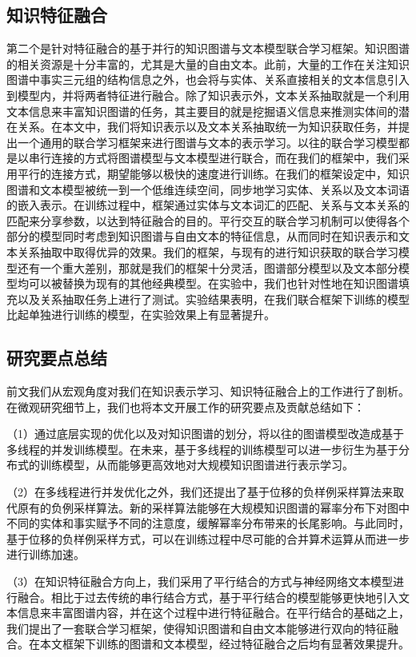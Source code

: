 \subsection{知识特征融合}

第二个是针对特征融合的基于并行的知识图谱与文本模型联合学习框架。知识图谱的相关资源是十分丰富的，尤其是大量的自由文本。此前，大量的工作在关注知识图谱中事实三元组的结构信息之外，也会将与实体、关系直接相关的文本信息引入到模型内，并将两者特征进行融合。除了知识表示外，文本关系抽取就是一个利用文本信息来丰富知识图谱的任务，其主要目的就是挖掘语义信息来推测实体间的潜在关系。在本文中，我们将知识表示以及文本关系抽取统一为知识获取任务，并提出一个通用的联合学习框架来进行图谱与文本的表示学习。以往的联合学习模型都是以串行连接的方式将图谱模型与文本模型进行联合，而在我们的框架中，我们采用平行的连接方式，期望能够以极快的速度进行训练。在我们的框架设定中，知识图谱和文本模型被统一到一个低维连续空间，同步地学习实体、关系以及文本词语的嵌入表示。在训练过程中，框架通过实体与文本词汇的匹配、关系与文本关系的匹配来分享参数，以达到特征融合的目的。平行交互的联合学习机制可以使得各个部分的模型同时考虑到知识图谱与自由文本的特征信息，从而同时在知识表示和文本关系抽取中取得优异的效果。我们的框架，与现有的进行知识获取的联合学习模型还有一个重大差别，那就是我们的框架十分灵活，图谱部分模型以及文本部分模型均可以被替换为现有的其他经典模型。在实验中，我们也针对性地在知识图谱填充以及关系抽取任务上进行了测试。实验结果表明，在我们联合框架下训练的模型比起单独进行训练的模型，在实验效果上有显著提升。

\subsection{研究要点总结}


	前文我们从宏观角度对我们在知识表示学习、知识特征融合上的工作进行了剖析。在微观研究细节上，我们也将本文开展工作的研究要点及贡献总结如下：

  （1）通过底层实现的优化以及对知识图谱的划分，将以往的图谱模型改造成基于多线程的并发训练模型。在未来，基于多线程的训练模型可以进一步衍生为基于分布式的训练模型，从而能够更高效地对大规模知识图谱进行表示学习。
  
  （2）在多线程进行并发优化之外，我们还提出了基于位移的负样例采样算法来取代原有的负例采样算法。新的采样算法能够在大规模知识图谱的幂率分布下对图中不同的实体和事实赋予不同的注意度，缓解幂率分布带来的长尾影响。与此同时，基于位移的负样例采样方式，可以在训练过程中尽可能的合并算术运算从而进一步进行训练加速。
  
  （3）在知识特征融合方向上，我们采用了平行结合的方式与神经网络文本模型进行融合。相比于过去传统的串行结合方式，基于平行结合的模型能够更快地引入文本信息来丰富图谱内容，并在这个过程中进行特征融合。在平行结合的基础之上，我们提出了一套联合学习框架，使得知识图谱和自由文本能够进行双向的特征融合。在本文框架下训练的图谱和文本模型，经过特征融合之后均有显著效果提升。
  
